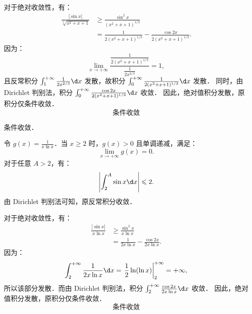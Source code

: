 \begin{solution}
    对于绝对收敛性，有：
    \begin{equation}
        \begin{aligned}
            \frac{|\sin x|}{\sqrt[3]{x^2 + x + 1}} & \geqslant \frac{\sin^2 x}{(x^2 + x + 1)^{1/3}}                           \\
                                                   & = \frac{1}{2(x^2 + x + 1)^{1/3}} - \frac{\cos 2x}{2(x^2 + x + 1)^{1/3}}.
        \end{aligned}
    \end{equation}
    因为：
    \begin{equation}
        \lim_{x \to +\infty} \frac{\frac{1}{2(x^2 + x + 1)^{1/3}}}{\frac{1}{2x^{2/3}}} = 1,
    \end{equation}
    且反常积分 $\int_1^{+\infty} \frac{1}{2x^{2/3}} \d x$ 发散，故积分 $\int_0^{+\infty} \frac{1}{2(x^2 + x + 1)^{1/3}} \d x$ 发散．
    同时，由 Dirichlet 判别法，积分 $\int_0^{+\infty} \frac{\cos 2x}{2(x^2 + x + 1)^{1/3}} \d x$ 收敛．
    因此，绝对值积分发散，原积分仅条件收敛．
    \begin{equation}
        \boxed{\text{条件收敛}}
    \end{equation}

     条件收敛．

    令 $g(x) = \frac{1}{x \ln x}$．当 $x \geqslant 2$ 时，$g(x) > 0$ 且单调递减，满足：
    \begin{equation}
        \lim_{x \to +\infty} g(x) = 0.
    \end{equation}
    对于任意 $A > 2$，有：
    \begin{equation}
        \left| \int_2^A \sin x \d x \right| \leqslant 2.
    \end{equation}
    由 Dirichlet 判别法可知，原反常积分收敛．

    对于绝对收敛性，有：
    \begin{equation}
        \begin{aligned}
            \frac{|\sin x|}{x \ln x} & \geqslant \frac{\sin^2 x}{x \ln x}               \\
                                     & = \frac{1}{2x \ln x} - \frac{\cos 2x}{2x \ln x}.
        \end{aligned}
    \end{equation}
    因为：
    \begin{equation}
        \int_2^{+\infty} \frac{1}{2x \ln x} \d x = \left. \frac{1}{2} \ln(\ln x) \right|_2^{+\infty} = +\infty,
    \end{equation}
    所以该部分发散．而由 Dirichlet 判别法，积分 $\int_2^{+\infty} \frac{\cos 2x}{2x \ln x} \d x$ 收敛．
    因此，绝对值积分发散，原积分仅条件收敛．
    \begin{equation}
        \boxed{\text{条件收敛}}
    \end{equation}


\end{solution}
